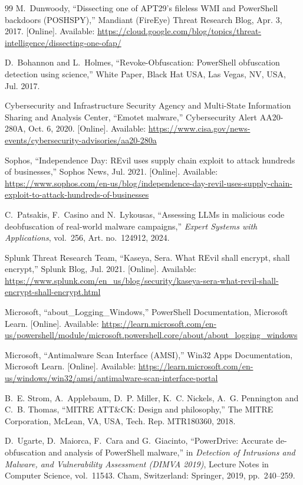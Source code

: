 \documentclass[12pt,a4paper]{article}
\begin{document}
\begin{thebibliography}{99}
 M.~Dunwoody, ``Dissecting one of APT29's fileless WMI and PowerShell backdoors (POSHSPY),'' Mandiant (FireEye) Threat Research Blog, Apr. 3, 2017. [Online]. Available: \url{https://cloud.google.com/blog/topics/threat-intelligence/dissecting-one-ofap/}

 D.~Bohannon and L.~Holmes, ``Revoke-Obfuscation: PowerShell obfuscation detection using science,'' White Paper, Black Hat USA, Las Vegas, NV, USA, Jul. 2017.

 Cybersecurity and Infrastructure Security Agency and Multi-State Information Sharing and Analysis Center, ``Emotet malware,'' Cybersecurity Alert AA20-280A, Oct. 6, 2020. [Online]. Available: \url{https://www.cisa.gov/news-events/cybersecurity-advisories/aa20-280a}

 Sophos, ``Independence Day: REvil uses supply chain exploit to attack hundreds of businesses,'' Sophos News, Jul. 2021. [Online]. Available: \url{https://www.sophos.com/en-us/blog/independence-day-revil-uses-supply-chain-exploit-to-attack-hundreds-of-businesses}

 C.~Patsakis, F.~Casino and N.~Lykousas, ``Assessing LLMs in malicious code deobfuscation of real-world malware campaigns,'' \emph{Expert Systems with Applications}, vol.~256, Art. no.~124912, 2024.

 Splunk Threat Research Team, ``Kaseya, Sera. What REvil shall encrypt, shall encrypt,'' Splunk Blog, Jul. 2021. [Online]. Available: \url{https://www.splunk.com/en_us/blog/security/kaseya-sera-what-revil-shall-encrypt-shall-encrypt.html}

 Microsoft, ``about\_Logging\_Windows,'' PowerShell Documentation, Microsoft Learn. [Online]. Available: \url{https://learn.microsoft.com/en-us/powershell/module/microsoft.powershell.core/about/about_logging_windows}

 Microsoft, ``Antimalware Scan Interface (AMSI),'' Win32 Apps Documentation, Microsoft Learn. [Online]. Available: \url{https://learn.microsoft.com/en-us/windows/win32/amsi/antimalware-scan-interface-portal}

 B.~E. Strom, A.~Applebaum, D.~P. Miller, K.~C. Nickels, A.~G. Pennington and C.~B. Thomas, ``MITRE ATT\&CK: Design and philosophy,'' The MITRE Corporation, McLean, VA, USA, Tech. Rep. MTR180360, 2018.

 D.~Ugarte, D.~Maiorca, F.~Cara and G.~Giacinto, ``PowerDrive: Accurate de-obfuscation and analysis of PowerShell malware,'' in \emph{Detection of Intrusions and Malware, and Vulnerability Assessment (DIMVA 2019)}, Lecture Notes in Computer Science, vol.~11543. Cham, Switzerland: Springer, 2019, pp.~240--259.


\end{thebibliography}
\end{document}

